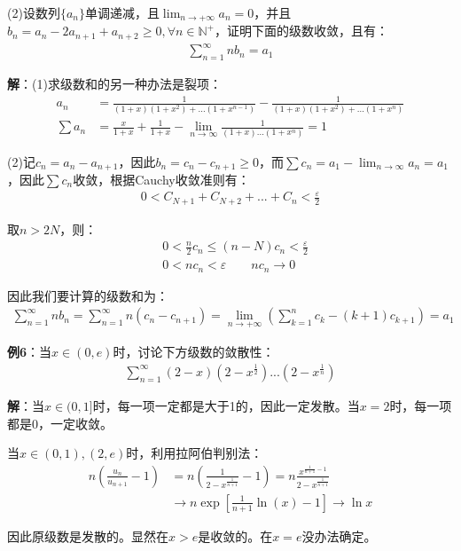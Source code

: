 \documentclass{ctexart}
\let\oldtextbf\textbf
\renewcommand{\textbf}[1]{\textcolor{brown!50!red}{\oldtextbf{#1}}}
\begin{document}
(2)设数列$\{a_n\}$单调递减，且$\lim_{n\to+\infty}a_n=0$，并且$b_n=a_n-2a_{n+1}+a_{n+2}\geq 0,\forall n\in\mathbb{N}^+$，证明下面的级数收敛，且有：
\begin{align*}
    \sum_{n=1}^\infty nb_n=a_1
\end{align*}

\textbf{\color{brown!50!red}解}：(1)求级数和的另一种办法是裂项：
\begin{align*}
   a_n&=\frac{1}{(1+x)(1+x^2)+...(1+x^{n-1})}-\frac{1}{(1+x)(1+x^2)+...(1+x^{n})} \\
\sum a_n&=\frac{x}{1+x}+\frac{1}{1+x}-\lim_{n\to\infty}\frac{1}{(1+x)...(1+x^n)}=1  
\end{align*}

(2)记$c_n=a_n-a_{n+1}$，因此$b_n=c_n-c_{n+1}\geq 0$，而$\sum c_n=a_1-\lim_{n\to\infty}a_n=a_1$，因此$\sum c_n$收敛，根据Cauchy收敛准则有：
\begin{align*}
    0<C_{N+1}+C_{N+2}+...+C_n<\frac{\varepsilon}{2}
\end{align*}

取$n>2N$，则：
\begin{align*}
    &0<\frac{n}{2}c_n\leq (n-N)c_n<\frac{\varepsilon}{2}\\
    &0<nc_n<\varepsilon\qquad nc_n\to 0
\end{align*}

因此我们要计算的级数和为：
\begin{align*}
    \sum_{n=1}^\infty nb_n=\sum_{n=1}^\infty n(c_n-c_{n+1})=\lim_{n\to+\infty}(\sum_{k=1}^n c_k-(k+1)c_{k+1})=a_1
\end{align*}

\textbf{\color{brown!50!red}例6}：当$x\in(0,e)$时，讨论下方级数的敛散性：
\begin{align*}
    \sum_{n=1}^\infty(2-x)(2-x^{\frac{1}{2}})...(2-x^\frac{1}{n})
\end{align*}

\textbf{\color{brown!50!red}解}：当$x\in(0,1]$时，每一项一定都是大于1的，因此一定发散。当$x=2$时，每一项都是0，一定收敛。

当$x\in(0,1),(2,e)$时，利用拉阿伯判别法：
\begin{align*}
  n(\frac{u_n}{u_{n+1}}-1)&=n(\frac{1}{2-x^{\frac{1}{n+1}}}-1)=n\frac{x^{\frac{1}{n+1}-1}}{2-x^\frac{1}{n+1}}\\
&\to n\exp[\frac{1}{n+1}\ln(x)-1]\to \ln x
\end{align*}

因此原级数是发散的。显然在$x>e$是收敛的。在$x=e$没办法确定。
\end{document}
